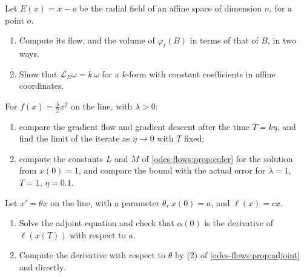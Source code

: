 \begin{notechapter}
\begin{exercise}\label{odes-flows:exr:6}
Let $E(x) = x - o$ be the radial field of an affine space of
dimension $n$, for a point $o$.
\begin{enumerate}[nosep]
  \item Compute its flow, and the volume of $\varphi_t(B)$ in terms of
        that of $B$, in two ways.
  \item Show that $\mathcal L_E\omega = k\,\omega$ for a $k$-form with
        constant coefficients in affine coordinates.
\end{enumerate}
\end{exercise}

\begin{exercise}\label{odes-flows:exr:7}
For $f(x) = \frac\lambda2x^2$ on the line, with $\lambda > 0$:
\begin{enumerate}[nosep]
  \item compare the gradient flow and gradient descent after the time
        $T = k\eta$, and find the limit of the iterate as
        $\eta\to0$ with $T$ fixed;
  \item compute the constants $L$ and $M$ of
        \cref{odes-flows:prop:euler} for the solution from $x(0) = 1$,
        and compare the bound with the actual error for
        $\lambda = 1$, $T = 1$, $\eta = 0.1$.
\end{enumerate}
\end{exercise}

\begin{exercise}\label{odes-flows:exr:8}
Let $x' = \theta x$ on the line, with a parameter $\theta$,
$x(0) = a$, and $\ell(x) = cx$.
\begin{enumerate}[nosep]
  \item Solve the adjoint equation and check that
        $\alpha(0)$ is the derivative of $\ell(x(T))$ with respect to
        $a$.
  \item Compute the derivative with respect to $\theta$ by (2) of
        \cref{odes-flows:prop:adjoint} and directly.
\end{enumerate}
\end{exercise}
\end{notechapter}
